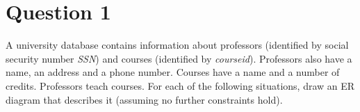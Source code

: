 
\section*{Question 1}

A university database contains information about professors (identified by social security number \textit{SSN}) and courses (identified by \textit{courseid}). Professors also have a name, an address and a phone number. Courses have a name and a number of credits. Professors teach courses. For each of the following situations, draw an ER diagram that describes it (assuming no further constraints hold).

